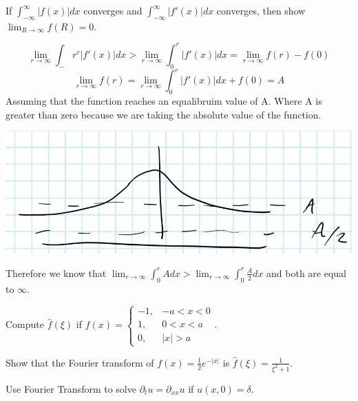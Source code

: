 \documentclass[12pt]{exam}
\newcommand{\abs}[1]{\ensuremath{\left\vert#1\right\vert}}
\newcommand{\pt}{\partial_t}
\newcommand{\pxx}{\partial_{xx}}
\begin{document}
\newpage 
\begin{questions}
\begin{question}
If $\int_{-\infty}^{\infty} \abs{f(x)}dx$ converges and $\int_{-\infty}^{\infty}\abs{f'(x)}dx$ converges, then show 
$\lim_{R\to\infty}f(R) = 0$.
\end{question}
\begin{solutionorbox}[\stretch{1}]
\[\lim_{r\to \infty}\int_-r^r \abs{f'(x)}dx >\lim_{r\to \infty}\int_0^r \abs{f'(x)}dx =\lim_{r\to \infty} f(r) - f(0)\]
\[\lim_{r\to \infty}f(r) = \lim_{r\to \infty}\int_0^r \abs{f'(x)}dx + f(0) = A\]
Assuming that the function reaches an equalibruim value of A. Where A is greater than zero because we are taking the absolute value of the function.
\begin{minipage}{\linewidth}
    \includegraphics[width=\linewidth]{handgraph1.png}
\end{minipage}
Therefore we know that \(\lim_{r\to \infty}\int_0^r A dx > \lim_{r\to \infty}\int_0^r \frac{A}{2} dx\) and both are equal to \(\infty\).
\end{solutionorbox}

\newpage 
\begin{question}
Compute $\hat{f}(\xi)$ if $f(x) = \begin{cases}-1, & -a<x<0\\ 1, & 0<x<a\\ 0, & \abs{x}>a\end{cases}.$
\end{question}
\begin{solutionorbox}[\stretch{1}]
\end{solutionorbox}


\newpage 
\begin{question}
Show that the Fourier transform of $f(x) = \frac{1}{2}e^{-\abs{x}}$ is $\hat{f}(\xi) = \frac{1}{\xi^2 + 1}$.
\end{question}
\begin{solutionorbox}[\stretch{1}]
\end{solutionorbox}

\newpage 
\begin{question}
Use Fourier Transform to solve $\pt u = \pxx u$ if $u(x,0) = \delta$.
\end{question}
\begin{solutionorbox}[\stretch{1}]
\end{solutionorbox}


\end{questions}
\end{document}
